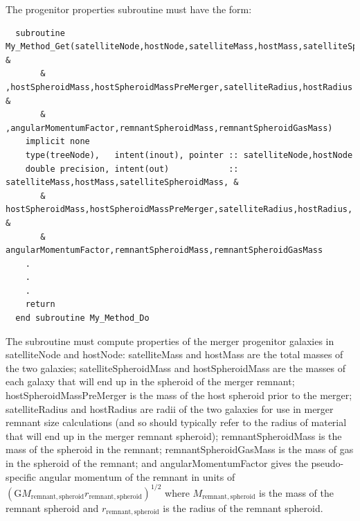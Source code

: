 The progenitor properties subroutine must have the form:
\begin{verbatim}
  subroutine My_Method_Get(satelliteNode,hostNode,satelliteMass,hostMass,satelliteSpheroidMass &
       & ,hostSpheroidMass,hostSpheroidMassPreMerger,satelliteRadius,hostRadius &
       & ,angularMomentumFactor,remnantSpheroidMass,remnantSpheroidGasMass)
    implicit none
    type(treeNode),   intent(inout), pointer :: satelliteNode,hostNode
    double precision, intent(out)            :: satelliteMass,hostMass,satelliteSpheroidMass, &
       & hostSpheroidMass,hostSpheroidMassPreMerger,satelliteRadius,hostRadius, &
       & angularMomentumFactor,remnantSpheroidMass,remnantSpheroidGasMass
    .
    .
    .
    return
  end subroutine My_Method_Do
\end{verbatim}
The subroutine must compute properties of the merger progenitor galaxies in {\normalfont \ttfamily satelliteNode} and {\normalfont \ttfamily hostNode}: {\normalfont \ttfamily satelliteMass} and {\normalfont \ttfamily hostMass} are the total masses of the two galaxies; {\normalfont \ttfamily satelliteSpheroidMass} and {\normalfont \ttfamily hostSpheroidMass} are the masses of each galaxy that will end up in the spheroid of the merger remnant; {\normalfont \ttfamily hostSpheroidMassPreMerger} is the mass of the host spheroid prior to the merger; {\normalfont \ttfamily satelliteRadius} and {\normalfont \ttfamily hostRadius} are radii of the two galaxies for use in merger remnant size calculations (and so should typically refer to the radius of material that will end up in the merger remnant spheroid); {\normalfont \ttfamily remnantSpheroidMass} is the mass of the spheroid in the remnant; {\normalfont \ttfamily remnantSpheroidGasMass} is the mass of gas in the spheroid of the remnant; and {\normalfont \ttfamily angularMomentumFactor} gives the pseudo-specific angular momentum of the remnant in units of $(\mathrm{G} M_\mathrm{remnant,spheroid} r_\mathrm{remnant,spheroid})^{1/2}$ where $M_\mathrm{remnant,spheroid}$ is the mass of the 
remnant spheroid and $r_\mathrm{remnant,spheroid}$ is the radius of the remnant spheroid.

